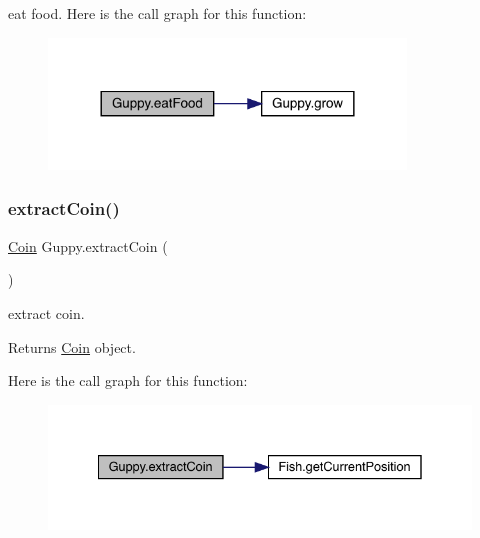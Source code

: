 eat food. Here is the call graph for this function\+:
\nopagebreak
\begin{figure}[H]
\begin{center}
\leavevmode
\includegraphics[width=269pt]{class_guppy_a2b234c201f80dbed1db3a58e4ee7840b_cgraph}
\end{center}
\end{figure}
\mbox{\label{class_guppy_aa78a5306116056c8b4bedcf79bae6ad3}} 
\subsubsection{\texorpdfstring{extract\+Coin()}{extractCoin()}}
{\footnotesize\ttfamily \mbox{\hyperlink{class_coin}{Coin}} Guppy.\+extract\+Coin (\begin{DoxyParamCaption}{ }\end{DoxyParamCaption})\hspace{0.3cm}{\ttfamily [inline]}}

extract coin. \begin{DoxyReturn}{Returns}
\mbox{\hyperlink{class_coin}{Coin}} object. 
\end{DoxyReturn}
Here is the call graph for this function\+:
\nopagebreak
\begin{figure}[H]
\begin{center}
\leavevmode
\includegraphics[width=335pt]{class_guppy_aa78a5306116056c8b4bedcf79bae6ad3_cgraph}
\end{center}
\end{figure}
\mbox{\label{class_guppy_a7279fb164e708367a71b3d8501adff97}} 
